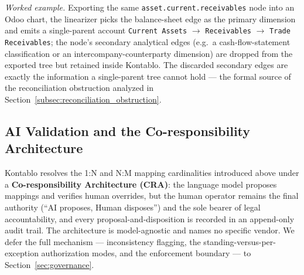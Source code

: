 \emph{Worked example.} Exporting the same \texttt{asset.current.receivables}
node into an Odoo chart, the linearizer picks the balance-sheet edge as the
primary dimension and emits a single-parent account \texttt{Current Assets}
$\rightarrow$ \texttt{Receivables} $\rightarrow$ \texttt{Trade Receivables};
the node's secondary analytical edges (e.g.\ a cash-flow-statement
classification or an intercompany-counterparty dimension) are dropped from the
exported tree but retained inside Kontablo. The discarded secondary edges are
exactly the information a single-parent tree cannot hold --- the formal source
of the reconciliation obstruction analyzed in
Section~\ref{subsec:reconciliation_obstruction}.

\subsection{AI Validation and the Co-responsibility Architecture}
Kontablo resolves the 1:N and N:M mapping cardinalities introduced above under a
\textbf{Co-responsibility Architecture (CRA)}: the language model proposes
mappings and verifies human overrides, but the human operator remains the final
authority (``AI proposes, Human disposes'') and the sole bearer of legal
accountability, and every proposal-and-disposition is recorded in an append-only
audit trail. The architecture is model-agnostic and names no specific vendor. We
defer the full mechanism --- inconsistency flagging, the standing-versus-per-exception
authorization modes, and the enforcement boundary --- to
Section~\ref{sec:governance}.
